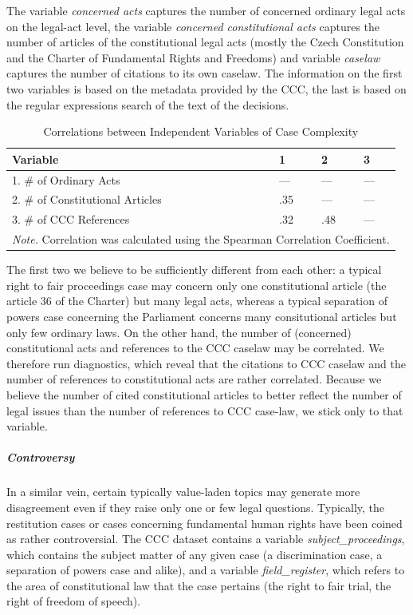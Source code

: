 \documentclass[
  11pt,
]{article}
\begin{document}
The variable \emph{concerned acts} captures the number of concerned
ordinary legal acts on the legal-act level, the variable \emph{concerned
constitutional acts} captures the number of articles of the
constitutional legal acts (mostly the Czech Constitution and the Charter
of Fundamental Rights and Freedoms) and variable \emph{caselaw} captures
the number of citations to its own caselaw. The information on the first
two variables is based on the metadata provided by the CCC, the last is
based on the regular expressions search of the text of the decisions.

\begin{table}

\caption{\label{tab:unnamed-chunk-3}Correlations between Independent Variables of Case Complexity}
\centering
\begin{tabular}[t]{l|l|l|l}
\hline
\textbf{Variable} & \textbf{1} & \textbf{2} & \textbf{3}\\
\hline
1. \# of Ordinary Acts & — & — & —\\
\hline
2. \# of Constitutional Articles & .35 & — & —\\
\hline
3. \# of CCC References & .32 & .48 & —\\
\hline
\multicolumn{4}{l}{\rule{0pt}{1em}\textit{Note.} Correlation was calculated using the Spearman Correlation Coefficient.}\\
\end{tabular}
\end{table}

The first two we believe to be sufficiently different from each other: a
typical right to fair proceedings case may concern only one
constitutional article (the article 36 of the Charter) but many legal
acts, whereas a typical separation of powers case concerning the
Parliament concerns many consitutional articles but only few ordinary
laws. On the other hand, the number of (concerned) constitutional acts
and references to the CCC caselaw may be correlated. We therefore run
diagnostics, which reveal that the citations to CCC caselaw and the
number of references to constitutional acts are rather correlated.
Because we believe the number of cited constitutional articles to better
reflect the number of legal issues than the number of references to CCC
case-law, we stick only to that variable.

\hypertarget{controversy}{%
\subparagraph{Controversy}\label{controversy}}

In a similar vein, certain typically value-laden topics may generate
more disagreement even if they raise only one or few legal questions.
Typically, the restitution cases or cases concerning fundamental human
rights have been coined as rather controversial. The CCC dataset
contains a variable \emph{subject\_proceedings}, which contains the
subject matter of any given case (a discrimination case, a separation of
powers case and alike), and a variable \emph{field\_register}, which
refers to the area of constitutional law that the case pertains (the
right to fair trial, the right of freedom of speech).
\end{document}

